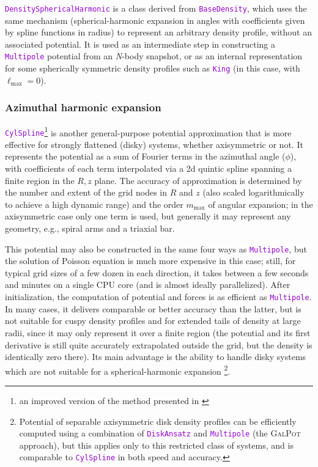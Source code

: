 \documentclass[12pt]{article}
\newcommand{\Nbody}{\textsl{N}-body\xspace}
\newcommand{\ttt}[1]{\textcolor{darkviolet}{\texttt{#1}}}
\begin{document}
\ttt{DensitySphericalHarmonic} is a class derived from \ttt{BaseDensity}, which uses the same mechanism (spherical-harmonic expansion in angles with coefficients given by spline functions in radius) to represent an arbitrary density profile, without an associated potential. It is used as an intermediate step in constructing a \ttt{Multipole} potential from an \Nbody snapshot, or as an internal representation for some spherically symmetric density profiles such as \ttt{King} (in this case, with $\ell_\mathrm{max}=0$).

\subsubsection{Azimuthal harmonic expansion}  \label{sec:PotentialCylSpline}

\ttt{CylSpline}\footnote{an improved version of the method presented in \cite{VasilievAthanassoula2015}} is another general-purpose potential approximation that is more effective for strongly flattened (disky) systems, whether axisymmetric or not. It represents the potential as a sum of Fourier terms in the azimuthal angle ($\phi$), with coefficients of each term interpolated via a 2d quintic spline spanning a finite region in the $R,z$ plane. The accuracy of approximation is determined by the number and extent of the grid nodes in $R$ and $z$ (also scaled logarithmically to achieve a high dynamic range) and the order $m_\mathrm{max}$ of angular expansion; in the axisymmetric case only one term is used, but generally it may represent any geometry, e.g., spiral arms and a triaxial bar.

This potential may also be constructed in the same four ways as \ttt{Multipole}, but the solution of Poisson equation is much more expensive in this case; still, for typical grid sizes of a few dozen in each direction, it takes between a few seconds and minutes on a single CPU core (and is almost ideally parallelized). After initialization, the computation of potential and forces is as efficient as \ttt{Multipole}. In many cases, it delivers comparable or better accuracy than the latter, but is not suitable for cuspy density profiles and for extended tails of density at large radii, since it may only represent it over a finite region (the potential and its first derivative is still quite accurately extrapolated outside the grid, but the density is identically zero there). Its main advantage is the ability to handle disky systems which are not suitable for a spherical-harmonic expansion%
\footnote{Potential of separable axisymmetric disk density profiles can be efficiently computed using a combination of \ttt{DiskAnsatz} and \ttt{Multipole} (the \textsc{GalPot} approach), but this applies only to this restricted class of systems, and is comparable to \ttt{CylSpline} in both speed and accuracy.}.
\end{document}
